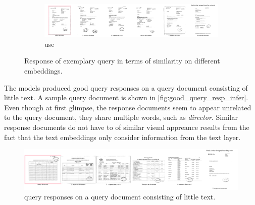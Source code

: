 \begin{figure}[h!]
    \begin{subfigure}{\textwidth}
        \centering
        \includegraphics[width=1\textwidth]{images/query_results/4b4d0a9ee0c7283e5bfd69c402c73b2140bf90351c8f44d6809afe23c6dfaa50/Most_similar_images_found_by_universal.pdf}
        \caption{\ac{use}}
        \label{fig:query_resp_use}
    \end{subfigure}
\caption[Exemplary query response]{Response of exemplary query in terms of similarity on different embeddings.}
\label{fig:query_resp}
\end{figure}

The models produced good query responses on a query document consisting of little text.
A sample query document is shown in \autoref{fig:good_query_resp_infer}.
Even though at first glimpse, the response documents seem to appear unrelated to the query document, they share multiple words, such as \textit{director}.
Similar response documents do not have to of similar visual appreance results from the fact that the text embeddings only consider information from the text layer.

\begin{figure}[htp] %
    \centering
    \includegraphics[width=1\textwidth]{images/query_results/42b7e56855c88c22ed01f381167e6f0887815e1ef7ea6b149be06ee1f8557b9e/Most_similar_images_found_by_infer.pdf}
    \caption[\infersent{} query responses]{\infersent{} query responses on a query document consisting of little text.
    }
    \label{fig:good_query_resp_infer}
\end{figure}

